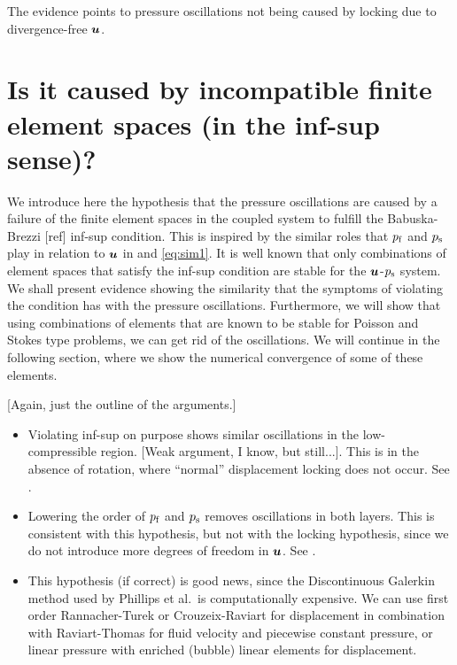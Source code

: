 
The evidence points to pressure oscillations not being caused by locking due to
divergence-free $\boldsymbol{u}$.

\section{Is it caused by incompatible finite element spaces (in the inf-sup sense)?}

We introduce here the hypothesis that the pressure oscillations are caused by a
failure of the finite element spaces in the coupled system to fulfill the
Babuska-Brezzi [ref] inf-sup condition.
This is inspired by the similar roles that $p_{\text{f}}$ and $p_{\text{s}}$ play in relation to $\boldsymbol{u}$
in  and \eqref{eq:sim1}.
It is well known that only combinations of element spaces that satisfy the
inf-sup condition are stable for the $\boldsymbol{u}$-$p_{\text{s}}$ system.
We shall present evidence showing the similarity that the symptoms of violating
the condition has with the pressure oscillations.
Furthermore, we will show that using combinations of elements that are known to
be stable for Poisson and Stokes type problems, we can get rid of the
oscillations.
We will continue in the following section, where we show the numerical
convergence of some of these elements.

[Again, just the outline of the arguments.]

\begin{itemize}
\item Violating inf-sup on purpose shows similar oscillations in the
  low-compressible region. [Weak argument, I know, but still...]. This is in
  the absence of rotation, where ``normal'' displacement locking does not
  occur. See .
\item Lowering the order of $p_{\text{f}}$ and $p_{\text{s}}$ removes oscillations in both
  layers. This is consistent with this hypothesis, but not with the locking
  hypothesis, since we do not introduce more degrees of freedom in $\boldsymbol{u}$. See
  .
\item This hypothesis (if correct) is good news, since the Discontinuous
  Galerkin method used by Phillips et al.~is computationally expensive. We can use first order
  Rannacher-Turek or Crouzeix-Raviart for displacement in combination with
  Raviart-Thomas for fluid velocity and piecewise constant pressure, or linear
  pressure with enriched (bubble) linear elements for displacement.
\end{itemize}

